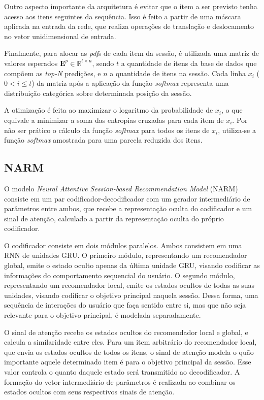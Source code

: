 Outro aspecto importante da arquitetura é evitar que o item a ser previsto tenha
acesso aos itens seguintes da sequência. Isso é feito a partir de uma máscara
aplicada na entrada da rede, que realiza operações de translação e deslocamento
no vetor unidimensional de entrada.

Finalmente, para alocar as \textit{pdf}s de cada item da sessão, é utilizada uma
matriz de valores esperados $\mathbf{E}^{p} \in \mathbb{R}^{t \times n}$, sendo
$t$ a quantidade de itens da base de dados que compõem as \textit{top-N}
predições, e $n$ a quantidade de itens na sessão. Cada linha $x_i$ ($0 < i \leq
t$) da matriz após a aplicação da função \textit{softmax} representa uma
distribuição categórica sobre determinada posição da sessão.

A otimização é feita ao maximizar o logaritmo da probabilidade de $x_i$, o que
equivale a minimizar a soma das entropias cruzadas para cada item de $x_i$. Por
não ser prático o cálculo da função \textit{softmax} para todos os itens de
$x_i$, utiliza-se a função \textit{softmax} amostrada para uma parcela reduzida
dos itens.

\subsection{NARM}
O modelo \textit{Neural Attentive Session-based Recommendation Model} (NARM)
\cite{narm} consiste em um par codificador-decodificador com um gerador
intermediário de parâmetros entre ambos, que recebe a representação oculta do
codificador e um sinal de atenção, calculado a partir da representação oculta do
próprio codificador.

O codificador consiste em dois módulos paralelos. Ambos consistem em uma RNN de
unidades GRU. O primeiro módulo, representando um recomendador global, emite o
estado oculto apenas da última unidade GRU, visando codificar as informações do
comportamento sequencial do usuário. O segundo módulo, representando um
recomendador local, emite os estados ocultos de todas as suas unidades, visando
codificar o objetivo principal naquela sessão. Dessa forma, uma sequência de
interações do usuário que faça sentido entre si, mas que não seja relevante para
o objetivo principal, é modelada separadamente.

O sinal de atenção recebe os estados ocultos do recomendador local e global, e
calcula a similaridade entre eles. Para um item arbitrário do recomendador local, que envia os estados ocultos de
todos os itens, o sinal de atenção modela o quão importante aquele determinado
item é para o objetivo principal da sessão. Esse valor controla o quanto daquele
estado será transmitido ao decodificador. A formação do vetor intermediário de
parâmetros é realizada ao combinar os estados ocultos com seus respectivos
sinais de atenção.

